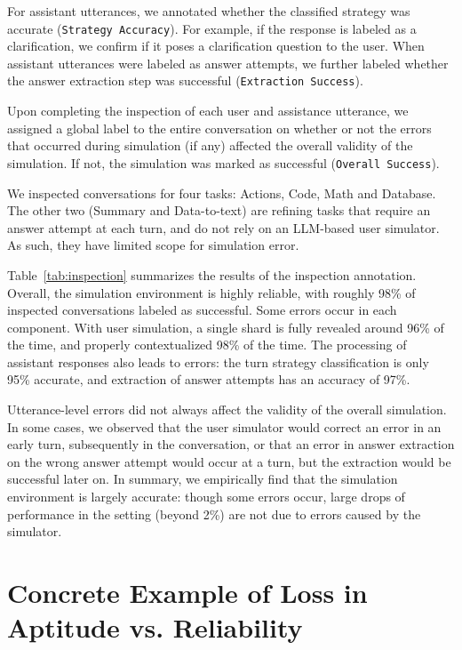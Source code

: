 \documentclass{article}
\begin{document}
\begin{appendices}
For assistant utterances, we annotated whether the classified strategy was accurate (\texttt{Strategy Accuracy}). For example, if the response is labeled as a clarification, we confirm if it poses a clarification question to the user. When assistant utterances were labeled as answer attempts, we further labeled whether the answer extraction step was successful (\texttt{Extraction Success}).

Upon completing the inspection of each user and assistance utterance, we assigned a global label to the entire conversation on whether or not the errors that occurred during simulation (if any) affected the overall validity of the simulation. If not, the simulation was marked as successful (\texttt{Overall Success}).

We inspected conversations for four tasks: Actions, Code, Math and Database. The other two (Summary and Data-to-text) are refining tasks that require an answer attempt at each turn, and do not rely on an LLM-based user simulator. As such, they have limited scope for simulation error.

Table~\ref{tab:inspection} summarizes the results of the inspection annotation. Overall, the simulation environment is highly reliable, with roughly 98\% of inspected conversations labeled as successful. Some errors occur in each component. With user simulation, a single shard is fully revealed around 96\% of the time, and properly contextualized 98\% of the time. The processing of assistant responses also leads to errors: the turn strategy classification is only 95\% accurate, and extraction of answer attempts has an accuracy of 97\%.

Utterance-level errors did not always affect the validity of the overall simulation. In some cases, we observed that the user simulator would correct an error in an early turn, subsequently in the conversation, or that an error in answer extraction on the wrong answer attempt would occur at a turn, but the extraction would be successful later on.
In summary, we empirically find that the simulation environment is largely accurate: though some errors occur, large drops of performance in the \shardedt setting (beyond 2\%) are not due to errors caused by the simulator.

\section{Concrete Example of Loss in Aptitude vs. Reliability} \label{app:concrete_a_vs_r}


\end{appendices}
\end{document}
